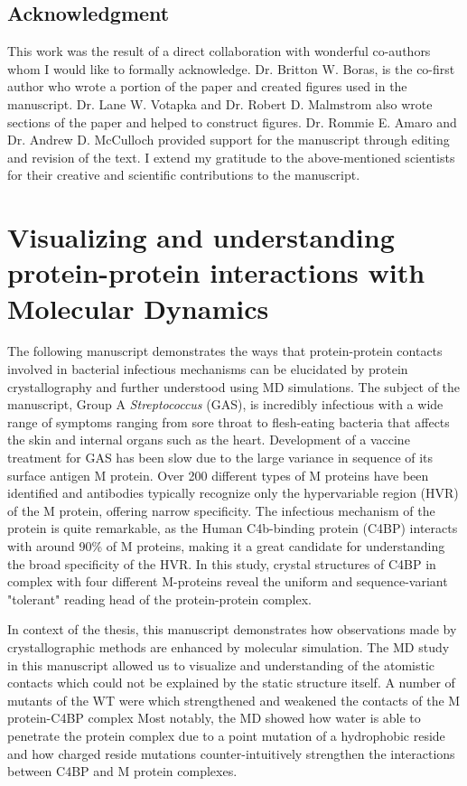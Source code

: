 \documentclass[12pt]{ucsddissertation}
\begin{document}
\section{Acknowledgment}
This work was the result of a direct collaboration with wonderful co-authors whom I would like to formally acknowledge. Dr. Britton W. Boras, is the co-first author who wrote a portion of the paper and created figures used in the manuscript. Dr. Lane W. Votapka and Dr. Robert D. Malmstrom also wrote sections of the paper and helped to construct figures. Dr. Rommie E. Amaro and Dr. Andrew D. McCulloch provided support for the manuscript through editing and revision of the text. I extend my gratitude to the above-mentioned scientists for their creative and scientific contributions to the manuscript. 



\chapter{Visualizing and understanding protein-protein interactions with Molecular Dynamics}\label{cosmo_paper}
\vspace*{-1cm}
The following manuscript demonstrates the ways that protein-protein contacts involved in bacterial infectious mechanisms can be elucidated by protein crystallography and further understood using MD simulations. The subject of the manuscript, Group A \textit{Streptococcus} (GAS), is incredibly infectious with a wide range of symptoms ranging from sore throat to flesh-eating bacteria that affects the skin and internal organs such as the heart. Development of a vaccine treatment for GAS has been slow due to the large variance in sequence of its surface antigen M protein. Over 200 different types of M proteins have been identified and antibodies typically recognize only the hypervariable region (HVR) of the M protein, offering narrow specificity. The infectious mechanism of the protein is quite remarkable, as the Human C4b-binding protein (C4BP) interacts with around 90\% of M proteins, making it a great candidate for understanding the broad specificity of the HVR. In this study, crystal structures of C4BP in complex with four different M-proteins reveal the uniform and sequence-variant "tolerant" reading head of the protein-protein complex. 

In context of the thesis, this manuscript demonstrates how observations made by crystallographic methods are enhanced by molecular simulation. The MD study in this manuscript allowed us to visualize and understanding of the atomistic contacts which could not be explained by the static structure itself.
A number of mutants of the WT were which strengthened and weakened the contacts of the M protein-C4BP complex  Most notably, the MD showed how water is able to penetrate the protein complex due to a point mutation of a hydrophobic reside and how charged reside mutations counter-intuitively strengthen the interactions between C4BP and M protein complexes.   \\
\end{document}
